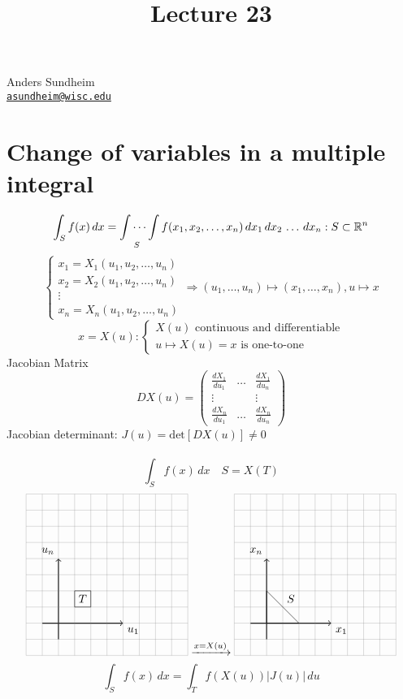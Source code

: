 \documentclass[12pt]{article}
\title{Lecture 23}
\newcommand{\BR}{\mathbb R}
\begin{document}
\maketitle
\vspace*{-0.25in}
\begin{center}
	Anders Sundheim \\
	\href{mailto:asundheim@wisc.edu}{{\tt asundheim@wisc.edu}}
\end{center}
\section*{Change of variables in a multiple integral}

    \[ \int_Sf(x)\,dx=\idotsint\limits_S f(x_1,x_2,\dots,x_n)\,dx_1\,dx_2\,\dots\,dx_n:S\subset\BR^n \]
    \[
      \begin{cases}
          x_1=X_1(u_1,u_2,\dots,u_n) \\
          x_2=X_2(u_1,u_2,\dots,u_n) \\
          \vdots \\
          x_n=X_n(u_1,u_2,\dots,u_n)
      \end{cases}
      \Rightarrow (u_1,\dots,u_n)\mapsto(x_1,\dots,x_n), u\mapsto x
    \]
    \[ 
        x=X(u):
        \begin{cases}
            X(u)\text{ continuous and differentiable} \\
            u\mapsto X(u)=x \text{ is one-to-one}
        \end{cases}
    \]
    Jacobian Matrix \\
    \[
        DX(u)=
        \begin{pmatrix*}
            \frac{dX_1}{du_1} & \dots & \frac{dX_1}{du_n} \\
            \vdots & & \vdots \\
            \frac{dX_n}{du_1} & \dots & \frac{dX_n}{du_n}
        \end{pmatrix*}
    \]
    Jacobian determinant: $J(u)=\text{det}[DX(u)]\neq 0$ \\
    \newline \newline \newline \\
    \[ \int_Sf(x)\,dx \quad S=X(T) \]
    \[
        \begin{tikzpicture}[scale=0.5]
            \draw[thick,->] (-1,0) -- (4,0) node[anchor=north west] {$u_1$};
            \draw[thick,->] (0,-1) -- (0,4) node[anchor=south east] {$u_n$};
            \draw[step=1cm,gray,very thin] (-2,-2) grid (8,8);
            \draw (1, 1) rectangle (2,2);
            \draw (1.5,2) node[anchor=north]{$T$};
        \end{tikzpicture}
        \xrightarrow{x=X(u)}
        \begin{tikzpicture}[scale=0.5]
            \draw[thick,->] (-1,0) -- (4,0) node[anchor=north west] {$x_1$};
            \draw[thick,->] (0,-1) -- (0,4) node[anchor=south east] {$x_n$};
            \draw[step=1cm,gray,very thin] (-2,-2) grid (8,8);
            \draw (0, 0) -- (0,2) -- (2,0) -- cycle;
            \draw (1.5,2) node[anchor=north]{$S$};
        \end{tikzpicture}
    \]
    \[ \int_Sf(x)\,dx=\int_Tf(X(u))|J(u)|\,du \]
\end{document}
